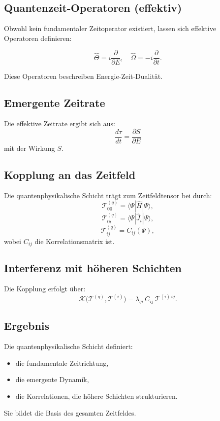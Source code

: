 \subsection{Quantenzeit-Operatoren (effektiv)}

Obwohl kein fundamentaler Zeitoperator existiert, lassen sich effektive
Operatoren definieren:

\[
\hat{\Theta} = i \frac{\partial}{\partial E},
\quad
\hat{\Omega} = -i \frac{\partial}{\partial t}.
\]

Diese Operatoren beschreiben Energie-Zeit-Dualität.

\subsection{Emergente Zeitrate}

Die effektive Zeitrate ergibt sich aus:
\[
\frac{d\tau}{dt} = \frac{\partial S}{\partial E}
\]
mit der Wirkung $S$.

\subsection{Kopplung an das Zeitfeld}

Die quantenphysikalische Schicht trägt zum Zeitfeldtensor bei durch:
\[
\mathcal{T}^{(q)}_{00} = \langle \Psi | \hat{H} | \Psi \rangle,
\]
\[
\mathcal{T}^{(q)}_{0i} = \langle \Psi | \hat{J}_i | \Psi \rangle,
\]
\[
\mathcal{T}^{(q)}_{ij} = C_{ij}(\Psi),
\]
wobei $C_{ij}$ die Korrelationsmatrix ist.

\subsection{Interferenz mit höheren Schichten}

Die Kopplung erfolgt über:
\[
\mathcal{K}\big(\mathcal{T}^{(q)}, \mathcal{T}^{(i)}\big)
= \lambda_{qi} \, C_{ij} \, \mathcal{T}^{(i)\,ij}.
\]

\subsection{Ergebnis}

Die quantenphysikalische Schicht definiert:

\begin{itemize}
\item die fundamentale Zeitrichtung,
\item die emergente Dynamik,
\item die Korrelationen, die höhere Schichten strukturieren.
\end{itemize}

Sie bildet die Basis des gesamten Zeitfeldes.
